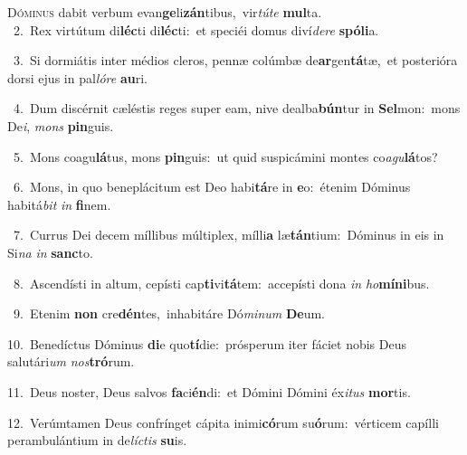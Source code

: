\lettrine{\initial\textcolor{\initialcolor}{D}}{óminus} dabit verbum evan\-\textbf{ge}\-li\-\textbf{zán}\-tibus,~\star vir\-\textit{tú}\-\textit{te} \textbf{mul}\-ta.\\
{\numbfont\textcolor{\numbcolor}{~2.}}~Rex virtútum di\-\textbf{léc}\-ti di\-\textbf{léc}\-ti:~\star et speciéi domus diví\-\textit{de}\-\textit{re} \textbf{spó}\-\textbf{li}a.\par
{\numbfont\textcolor{\numbcolor}{~3.}}~Si dormiátis inter médios cleros, pennæ colúmbæ de\-\textbf{ar}\-gen\-\textbf{tá}\-tæ,~\star et posterióra dorsi ejus in pal\-\textit{ló}\-\textit{re} \textbf{au}\-ri.\par
{\numbfont\textcolor{\numbcolor}{~4.}}~Dum discérnit cæléstis reges super eam, nive dealba\-\textbf{bún}\-tur in \textbf{Sel}\-mon:~\star mons De\-\textit{i}\-, \textit{mons} \textbf{pin}\-guis.\par
{\numbfont\textcolor{\numbcolor}{~5.}}~Mons coagu\-\textbf{lá}\-tus, mons \textbf{pin}\-guis:~\star ut quid suspicámini montes co\-\textit{a}\-\textit{gu}\textbf{lá}tos?\par
{\numbfont\textcolor{\numbcolor}{~6.}}~Mons, in quo beneplácitum est Deo habi\-\textbf{tá}\-re in \textbf{e}\-o:~\star étenim Dóminus habitá\textit{bit} \textit{in} \textbf{fi}\-nem.\par
{\numbfont\textcolor{\numbcolor}{~7.}}~Currus Dei decem míllibus múltiplex, mílli\textbf{a} læ\-\textbf{tán}\-tium:~\star Dóminus in eis in Si\textit{na} \textit{in} \textbf{sanc}\-to.\par
{\numbfont\textcolor{\numbcolor}{~8.}}~Ascendísti in altum, cepísti cap\-\textbf{ti}\-vi\-\textbf{tá}\-tem:~\star accepísti dona \textit{in} \textit{ho}\-\textbf{mí}\textbf{ni}bus.\par
{\numbfont\textcolor{\numbcolor}{~9.}}~Etenim \textbf{non} cre\-\textbf{dén}\-tes,~\star inhabitáre Dó\-\textit{mi}\-\textit{num} \textbf{De}\-um.\par
{\numbfont\textcolor{\numbcolor}{10.}}~Benedíctus Dóminus \textbf{di}\-e quo\-\textbf{tí}\-die:~\star prósperum iter fáciet nobis Deus salutári\textit{um} \textit{nos}\-\textbf{tró}rum.\par
{\numbfont\textcolor{\numbcolor}{11.}}~Deus noster, Deus salvos \textbf{fa}\-ci\-\textbf{én}\-di:~\star et Dómini Dómini éx\-\textit{i}\-\textit{tus} \textbf{mor}\-tis.\par
{\numbfont\textcolor{\numbcolor}{12.}}~Verúmtamen Deus confrínget cápita inimi\-\textbf{có}\-rum su\-\textbf{ó}\-rum:~\star vérticem capílli perambulántium in de\-\textit{líc}\-\textit{tis} \textbf{su}\-is.\par
